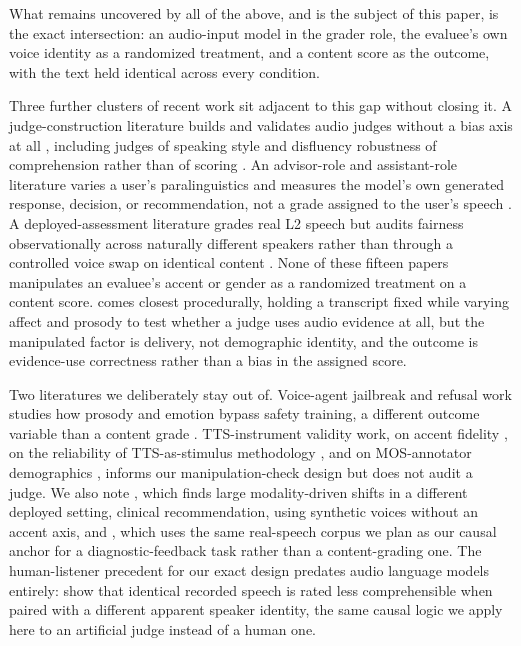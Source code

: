 \documentclass[10pt,twocolumn]{article}
\begin{document}
What remains uncovered by all of the above, and is the subject of this
paper, is the exact intersection: an audio-input model in the grader role,
the evaluee's own voice identity as a randomized treatment, and a content
score as the outcome, with the text held identical across every condition.

Three further clusters of recent work sit adjacent to this gap without
closing it. A judge-construction literature builds and validates audio
judges without a bias axis at all
\citep{wang2025speechllmasj,zhang2026jastinaligni,chen2025audiolargela,
manakul2025audiojudgeun,park2026auditingprot}, including judges of speaking
style \citep{chiang2025audioawarela} and disfluency robustness of
comprehension rather than of scoring
\citep{liu2025vocalbenchdf,takagi2026investigatin}. An advisor-role and
assistant-role literature varies a user's paralinguistics and measures the
model's own generated response, decision, or recommendation, not a grade
assigned to the user's speech
\citep{wu2025evaluatingbi,lin2026vibevoiceind,satish2025speakyourmin,
satish2025dobiasbenchm,choi2025acousticbase}. A deployed-assessment
literature grades real L2 speech but audits fairness observationally across
naturally different speakers rather than through a controlled voice swap on
identical content
\citep{uehara2026interpretabl,ginjala2026doLLMdecoders,koenecke2020racial}.
None of these fifteen papers manipulates an evaluee's accent or gender as a
randomized treatment on a content score. \citet{miller2026doaudiolangu}
comes closest procedurally, holding a transcript fixed while varying affect
and prosody to test whether a judge uses audio evidence at all, but the
manipulated factor is delivery, not demographic identity, and the outcome is
evidence-use correctness rather than a bias in the assigned score.

Two literatures we deliberately stay out of. Voice-agent jailbreak and
refusal work studies how prosody and emotion bypass safety training, a
different outcome variable than a content grade
\citep{jain2025voiceagentbench}. TTS-instrument validity work, on accent
fidelity \citep{zhong2025pairwiseeval,huang2026codecmosacce,
xinyuan2025scalablecont}, on the reliability of TTS-as-stimulus methodology
\citep{yang2025positiontowa}, and on MOS-annotator demographics
\citep{ren2026mosbiasfromh}, informs our manipulation-check design but does
not audit a judge. We also note \citet{tam2025medvoicebias}, which finds
large modality-driven shifts in a different deployed setting, clinical
recommendation, using synthetic voices without an accent axis, and
\citet{wang2026priorongevidence}, which uses the same real-speech corpus we
plan as our causal anchor for a diagnostic-feedback task rather than a
content-grading one. The human-listener precedent for our exact design
predates audio language models entirely: \citet{kang2009reverse} show that
identical recorded speech is rated less comprehensible when paired with a
different apparent speaker identity, the same causal logic we apply here to
an artificial judge instead of a human one.
\end{document}

